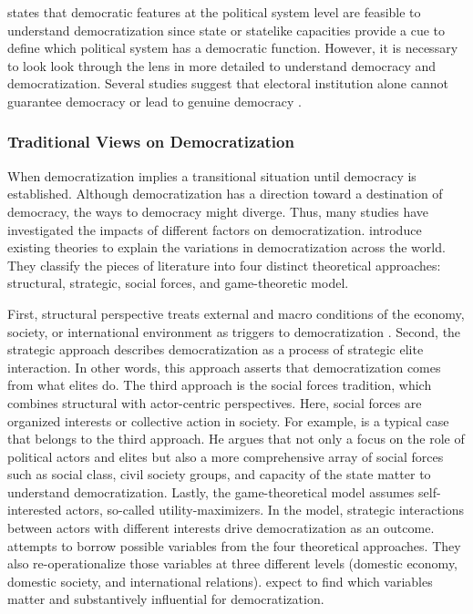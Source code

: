 \documentclass[11pt]{article}
\begin{document}
\citet[44]{Warren2017} states that democratic features at the political system level are feasible to understand democratization since state or statelike capacities provide a cue to define which political system has a democratic function. However, it is necessary to look look through the lens in more detailed to understand democracy and democratization. Several studies suggest that electoral institution alone cannot guarantee democracy or lead to genuine democracy \citep{Miller2015a, Miller2015b, Wahman2013, Levitsky2010a, Hadenius2007}.

\subsubsection*{Traditional Views on Democratization}

When democratization implies a transitional situation until democracy is established. Although democratization has a direction toward a destination of democracy, the ways to democracy might diverge. Thus, many studies have investigated the impacts of different factors on democratization. \citet[71]{Bergschlosser2007ch2} introduce existing theories to explain the variations in democratization across the world. They classify the pieces of literature into four distinct theoretical approaches: structural, strategic, social forces, and game-theoretic model.

First, structural perspective treats external and macro conditions of the economy, society, or international environment as triggers to democratization \citep{Pop-Eleches2015}. Second, the strategic approach describes democratization as a process of strategic elite interaction. In other words, this approach asserts that democratization comes from what elites do. The third approach is the social forces tradition, which combines structural with actor-centric perspectives. Here, social forces are organized interests or collective action in society. For example, \citet{Gill2000} is a typical case that belongs to the third approach. He argues that not only a focus on the role of political actors and elites but also a more comprehensive array of social forces such as social class, civil society groups, and capacity of the state matter to understand democratization. Lastly, the game-theoretical model assumes self-interested actors, so-called utility-maximizers. In the model, strategic interactions between actors with different interests drive democratization as an outcome. \citet{Bergschlosser2007ch2} attempts to borrow possible variables from the four theoretical approaches. They also re-operationalize those variables at three different levels (domestic economy, domestic society, and international relations). \citet{Bergschlosser2007ch2} expect to find which variables matter and substantively influential for democratization.
\end{document}
